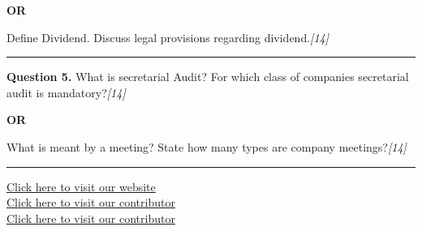 \documentclass[11pt,a4paper]{article}
\newcommand{\pts}[1]{\hfill   \textit{[#1]}}
\begin{document}
\centerline{   \textbf{OR}}

Define Dividend. Discuss legal provisions regarding dividend.\pts{14}

\medskip\rule{\linewidth}{0.2pt}




\noindent   \textbf{Question 5.}
What is secretarial Audit? For which class of companies secretarial audit is mandatory?\pts{14}

\centerline{   \textbf{OR}}

What is meant by a meeting? State how many types are company meetings?\pts{14}

\vfill
\rule{\linewidth}{0.4pt}

\begin{center}\small
\href{https://bhu-exam.vercel.app/}{Click here to visit our website}\\[4pt]
\href{https://me-aryan.vercel.app/}{Click here to visit our contributor}\\[4pt]
\href{https://quashan-me.vercel.app/}{Click here to visit our contributor}
\end{center}
\end{document}
